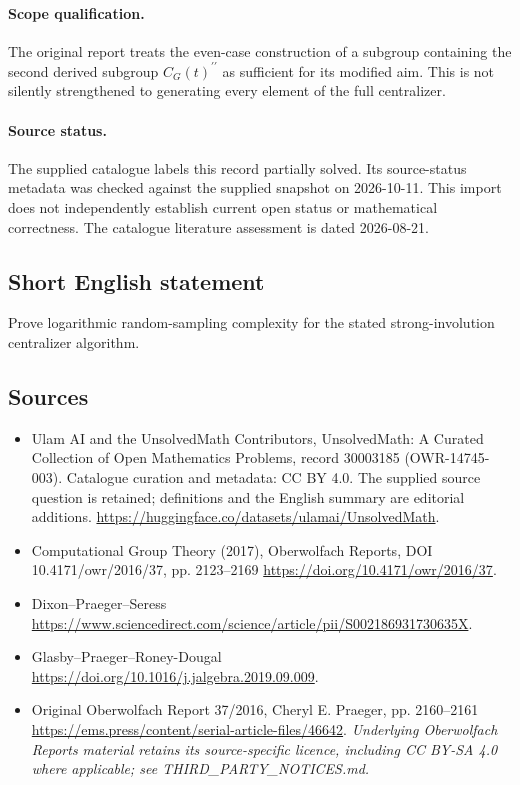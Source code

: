 \documentclass[11pt]{article}
\begin{document}
\paragraph{Scope qualification.}
The original report treats the even-case construction of a subgroup containing the second derived subgroup $C_G(t)^{\prime\prime}$ as sufficient for its modified aim. This is not silently strengthened to generating every element of the full centralizer.
\paragraph{Source status.}
The supplied catalogue labels this record partially solved. Its source-status metadata was checked against the supplied snapshot on 2026-10-11. This import does not independently establish current open status or mathematical correctness. The catalogue literature assessment is dated 2026-08-21.
\subsection{Short English statement}
Prove logarithmic random-sampling complexity for the stated strong-involution centralizer algorithm.
\subsection{Sources}
\begin{itemize}
\item[S1] Ulam AI and the UnsolvedMath Contributors, UnsolvedMath: A Curated Collection of Open Mathematics Problems, record 30003185 (OWR-14745-003). Catalogue curation and metadata: CC BY 4.0. The supplied source question is retained; definitions and the English summary are editorial additions.
\url{https://huggingface.co/datasets/ulamai/UnsolvedMath}.
\item[S2] Computational Group Theory (2017), Oberwolfach Reports, DOI 10.4171/owr/2016/37, pp. 2123--2169
\url{https://doi.org/10.4171/owr/2016/37}.
\item[S3] Dixon--Praeger--Seress
\url{https://www.sciencedirect.com/science/article/pii/S002186931730635X}.
\item[S4] Glasby--Praeger--Roney-Dougal
\url{https://doi.org/10.1016/j.jalgebra.2019.09.009}.
\item[S5] Original Oberwolfach Report 37/2016, Cheryl E. Praeger, pp. 2160--2161
\url{https://ems.press/content/serial-article-files/46642}.
\textit{Underlying Oberwolfach Reports material retains its source-specific licence, including CC BY-SA 4.0 where applicable; see THIRD\_PARTY\_NOTICES.md.}
\end{itemize}
\end{document}
